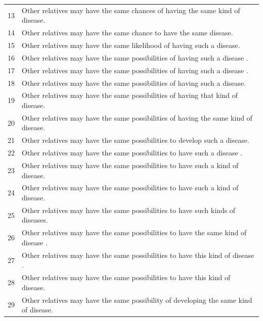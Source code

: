 \documentclass[letterpaper, 11pt]{article}
\begin{document}
\begin{table}[]
\begin{tabular}{ll}
		13                           & Other relatives may have the same chances of having the same kind of disease.         \\
		14                           & Other relatives may have the same chance to have the same disease.                    \\
		15                           & Other relatives may have the same likelihood of having such a disease.                \\
		16                           & Other relatives may have the same possibilities of having such a disease .            \\
		17                           & Other relatives may have the same possibilities of having such a disease .            \\
		18                           & Other relatives may have the same possibilities of having such a disease.             \\
		19                           & Other relatives may have the same possibilities of having that kind of disease.       \\
		20                           & Other relatives may have the same possibilities of having the same kind of disease.   \\
		21                           & Other relatives may have the same possibilities to develop such a disease.            \\
		22                           & Other relatives may have the same possibilities to have such a disease .              \\
		23                           & Other relatives may have the same possibilities to have such a kind of disease.       \\
		24                           & Other relatives may have the same possibilities to have such a kind of disease.       \\
		25                           & Other relatives may have the same possibilities to have such kinds of diseases.       \\
		26                           & Other relatives may have the same possibilities to have the same kind of disease .    \\
		27                           & Other relatives may have the same possibilities to have this kind of disease .        \\
		28                           & Other relatives may have the same possibilities to have this kind of disease.         \\
		29                           & Other relatives may have the same possibility of developing the same kind of disease. \\

\end{tabular}
\end{table}
\end{document}

